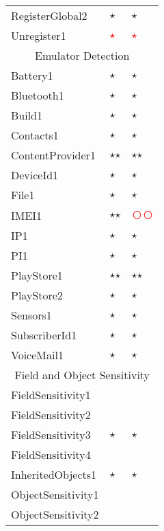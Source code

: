 \documentclass[../draft.tex]{subfiles}
\newcommand{\fp}{\textcolor{white}{\textcircled{\textcolor{red}{$\star$}}}}
\newcommand{\fn}{\textcolor{red}{\textcircled{ }}}
\newcommand{\tp}[0]{\textcircled{$\star$}}
\newcommand{\tsub}[1]{\multicolumn{3}{c}{#1}\\\hline}
\begin{document}
\begin{longtable}{l | l | l}
        RegisterGlobal2 & \tp & \tp\\
        Unregister1 & \fp & \fp\\
        \hline
        \tsub{Emulator Detection}
        Battery1 & \tp & \tp\\
        Bluetooth1 & \tp & \tp\\
        Build1 & \tp & \tp\\
        Contacts1 & \tp & \tp\\
        ContentProvider1 & \tp \tp & \tp \tp\\
        DeviceId1 & \tp & \tp\\
        File1 & \tp & \tp\\
        IMEI1 & \tp \tp & \fn \fn\\
        IP1 & \tp & \tp\\
        PI1 & \tp & \tp\\
        PlayStore1 & \tp \tp & \tp \tp\\
        PlayStore2 & \tp & \tp\\
        Sensors1 & \tp & \tp\\
        SubscriberId1 & \tp & \tp\\
        VoiceMail1 & \tp & \tp\\
        \hline
        \tsub{Field and Object Sensitivity}
        FieldSensitivity1 & & \\
        FieldSensitivity2 & & \\
        FieldSensitivity3 & \tp & \tp\\
        FieldSensitivity4 & & \\
        InheritedObjects1 & \tp & \tp\\
        ObjectSensitivity1 & & \\
        ObjectSensitivity2 & & \\
        \hline

\end{longtable}
\end{document}
